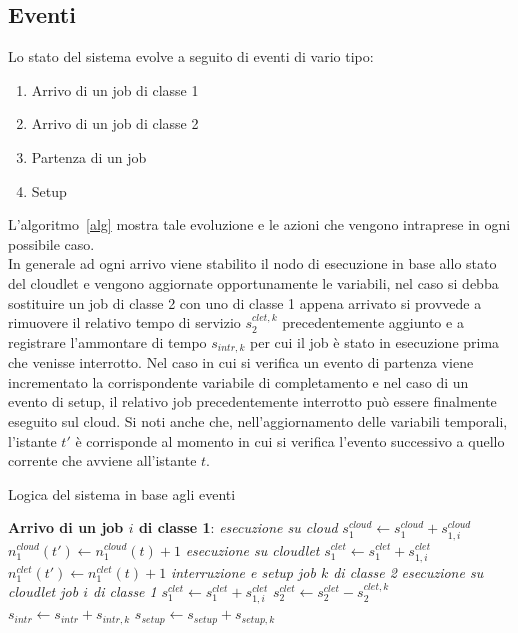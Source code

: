 {{\subsection{Eventi}
Lo stato del sistema evolve a seguito di eventi di vario tipo:
\begin{enumerate}
\item{Arrivo di un job di classe 1}
\item{Arrivo di un job di classe 2}
\item{Partenza di un job}
\item{Setup}
\end{enumerate}
%
L'algoritmo~\ref{alg} mostra tale evoluzione e le azioni che vengono intraprese
in ogni possibile caso.\\
In generale ad ogni arrivo viene stabilito il nodo di esecuzione in base allo
stato del cloudlet e vengono aggiornate opportunamente le variabili, nel caso si
debba sostituire un job di classe 2 con uno di classe 1 appena arrivato si
provvede a rimuovere il relativo tempo di servizio $s_2^{clet,k}$
precedentemente aggiunto e a registrare l'ammontare di tempo $s_{intr,k}$ per
cui il job è stato in esecuzione prima che venisse interrotto.  Nel caso in cui
si verifica un evento di partenza viene incrementato la corrispondente variabile
di completamento e nel caso di un evento di setup, il relativo job
precedentemente interrotto può essere finalmente eseguito sul cloud. Si noti
anche che, nell'aggiornamento delle variabili temporali, l'istante $t'$ è
corrisponde al momento in cui si verifica l'evento successivo a quello corrente
che avviene all'istante $t$.
%
\begin{algorithm}[!h]
\centering
\caption{Logica del sistema in base agli eventi}
\label{alg}
\begin{algorithmic}
\STATE \textbf{Arrivo di un job $i$ di classe 1}:
\STATE \emph{esecuzione su cloud}
\STATE $s_1^{cloud} \leftarrow s_1^{cloud} + s_{1,i}^{cloud}$
\STATE $n_1^{cloud}(t') \leftarrow n_1^{cloud}(t) + 1$
\STATE \emph{esecuzione su cloudlet}
\STATE $s_1^{clet} \leftarrow s_1^{clet} + s_{1,i}^{clet}$
\STATE $n_1^{clet}(t') \leftarrow n_1^{clet}(t) + 1$
\STATE \emph{interruzione e setup job $k$ di classe 2}
\STATE \emph{esecuzione su cloudlet job $i$ di classe 1}
\STATE $s_1^{clet} \leftarrow s_1^{clet} + s_{1,i}^{clet}$
\STATE $s_2^{clet} \leftarrow s_2^{clet} - s_2^{clet,k}$
\STATE $s_{intr} \leftarrow s_{intr} + s_{intr,k}$
\STATE $s_{setup} \leftarrow s_{setup} + s_{setup,k}$

\end{algorithmic}
\end{algorithm}}}
